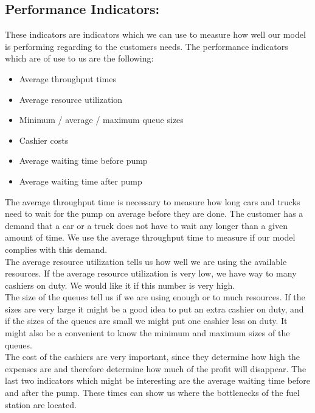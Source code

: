 \subsection{Performance Indicators:}
These indicators are indicators which we can use to measure how well our model is performing regarding to the customers needs. The performance indicators which are of use to us are the following:
\begin{itemize}
\item Average throughput times
\item Average resource utilization
\item Minimum / average / maximum queue sizes
\item Cashier costs
\item Average waiting time before pump
\item Average waiting time after pump
\end{itemize}
The average throughput time is necessary to measure how long cars and trucks need to wait for the pump on average before they are done. The customer has a demand that a car or a truck does not have to wait any longer than a given amount of time. We use the average throughput time to measure if our model complies with this demand. \\
\indent The average resource utilization tells us how well we are using the available resources. If the average resource utilization is very low, we have way to many cashiers on duty. We would like it if this number is very high. \\
\indent The size of the queues tell us if we are using enough or to much resources. If the sizes are very large it might be a good idea to put an extra cashier on duty, and if the sizes of the queues are small we might put one cashier less on duty. It might also be a convenient to know the minimum and maximum sizes of the queues.\\
\indent The cost of the cashiers are very important, since they determine how high the expenses are and therefore determine how much of the profit will disappear. The last two indicators which might be interesting are the average waiting time before and after the pump. These times can show us where the bottlenecks of the fuel station are located. 

